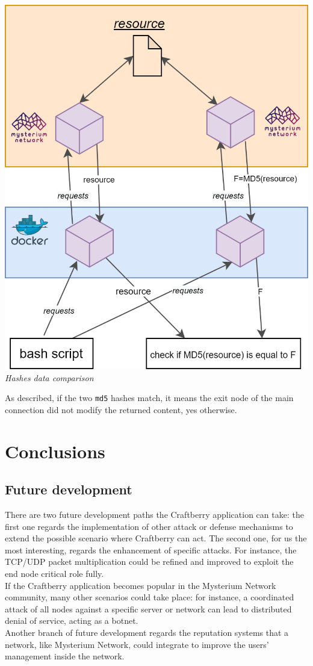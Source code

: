 \documentclass[12pt]{article}
\begin{document}
		\bigbreak
		\begin{center}
			\includegraphics[width=0.7\linewidth]{images/comparing_data_architecture.png}\\
			\small{\textit{Hashes data comparison}}
		\end{center}
		\bigbreak
		
		As described, if the two \lstinline{md5} hashes match, it means the exit node of the main connection did not modify the returned content, yes otherwise.

	\newpage
	\section{Conclusions}
		\subsection{Future development}
			There are two future development paths the Craftberry application can take: the first one regards the implementation of other attack or defense mechanisms to extend the possible scenario where Craftberry can act. The second one, for us the most interesting, regards the enhancement of specific attacks. For instance, the TCP/UDP packet multiplication could be refined and improved to exploit the end node critical role fully.\\
			If the Craftberry application becomes popular in the Mysterium Network community, many other scenarios could take place: for instance, a coordinated attack of all nodes against a specific server or network can lead to distributed denial of service, acting as a botnet.\\
			\bigbreak
			Another branch of future development regards the reputation systems that a network, like Mysterium Network, could integrate to improve the users' management inside the network.
\end{document}
